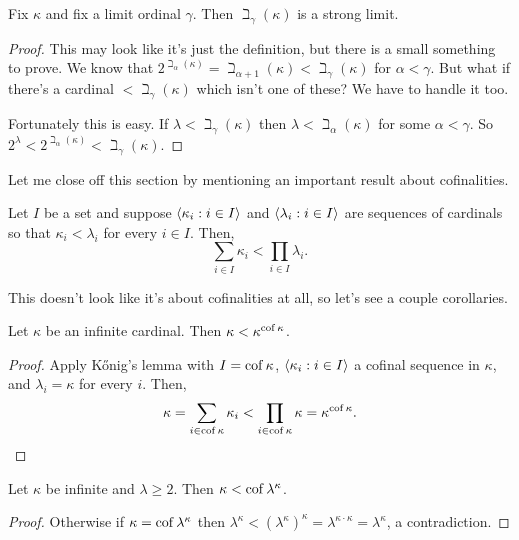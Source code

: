 \documentclass[10pt]{amsart}
\begin{document}
\begin{proposition}
Fix $\kappa$ and fix a limit ordinal $\gamma$. Then $\beth_\gamma(\kappa)$ is a strong limit.
\end{proposition}

\begin{proof}
This may look like it's just the definition, but there is a small something to prove. We know that $2^{\beth_\alpha(\kappa)} = \beth_{\alpha+1}(\kappa) < \beth_\gamma(\kappa)$ for $\alpha < \gamma$. But what if there's a cardinal $< \beth_\gamma(\kappa)$ which isn't one of these? We have to handle it too.

Fortunately this is easy. If $\lambda < \beth_\gamma(\kappa)$ then $\lambda < \beth_\alpha(\kappa)$ for some $\alpha < \gamma$. So $2^\lambda < 2^{\beth_\alpha(\kappa)} < \beth_\gamma(\kappa)$.
\end{proof}

Let me close off this section by mentioning an important result about cofinalities. 

\begin{theorem}
Let $I$ be a set and suppose ${\left\langle \kappa_i : i \in I \right\rangle}$ and ${\left\langle \lambda_i : i \in I \right\rangle}$ are sequences of cardinals so that $\kappa_i < \lambda_i$ for every $i \in I$. Then,
\[
\sum_{i \in I} \kappa_i < \prod_{i \in I} \lambda_i.
\]
\end{theorem}

This doesn't look like it's about cofinalities at all, so let's see a couple corollaries.

\begin{corollary}
Let $\kappa$ be an infinite cardinal. Then $\kappa < \kappa^{\operatorname{cof} \kappa}$.
\end{corollary}

\begin{proof}
Apply K\H{o}nig's lemma with $I = \operatorname{cof} \kappa$, ${\left\langle \kappa_i : i \in I \right\rangle}$ a cofinal sequence in $\kappa$, and $\lambda_i = \kappa$ for every $i$. Then,
\[
\kappa = \sum_{i \in \operatorname{cof} \kappa} \kappa_i < \prod_{i \in \operatorname{cof} \kappa} \kappa = \kappa^{\operatorname{cof} \kappa}. \qedhere
\]
\end{proof}

\begin{corollary}
Let $\kappa$ be infinite and $\lambda \ge 2$. Then $\kappa < \operatorname{cof} \lambda^\kappa$. 
\end{corollary}

\begin{proof}
Otherwise if $\kappa = \operatorname{cof} \lambda^\kappa$ then $\lambda^\kappa < (\lambda^\kappa)^\kappa = \lambda^{\kappa \cdot \kappa} = \lambda^\kappa$,
a contradiction.
\end{proof}
\end{document}
